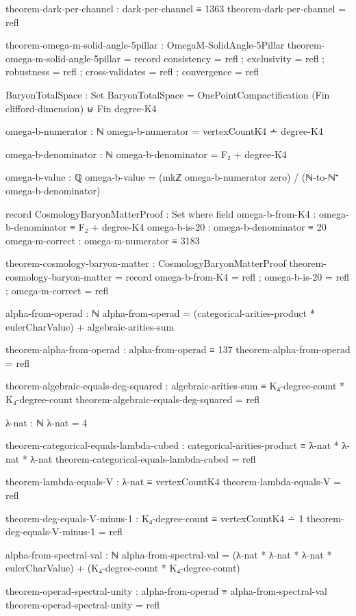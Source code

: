 \documentclass[11pt,a4paper]{book}
\begin{document}
\begin{code}
theorem-dark-per-channel : dark-per-channel ≡ 1363
theorem-dark-per-channel = refl

theorem-omega-m-solid-angle-5pillar : OmegaM-SolidAngle-5Pillar
theorem-omega-m-solid-angle-5pillar = record
  { consistency     = refl
  ; exclusivity     = refl
  ; robustness      = refl
  ; cross-validates = refl
  ; convergence     = refl
  }

BaryonTotalSpace : Set
BaryonTotalSpace = OnePointCompactification (Fin clifford-dimension) ⊎ Fin degree-K4

omega-b-numerator : ℕ
omega-b-numerator = vertexCountK4 ∸ degree-K4

omega-b-denominator : ℕ
omega-b-denominator = F₂ + degree-K4

omega-b-value : ℚ
omega-b-value = (mkℤ omega-b-numerator zero) / (ℕ-to-ℕ⁺ omega-b-denominator)

record CosmologyBaryonMatterProof : Set where
  field
    omega-b-from-K4 : omega-b-denominator ≡ F₂ + degree-K4
    omega-b-is-20   : omega-b-denominator ≡ 20
    omega-m-correct : omega-m-numerator ≡ 3183

theorem-cosmology-baryon-matter : CosmologyBaryonMatterProof
theorem-cosmology-baryon-matter = record
  { omega-b-from-K4 = refl
  ; omega-b-is-20   = refl
  ; omega-m-correct = refl
  }

alpha-from-operad : ℕ
alpha-from-operad = (categorical-arities-product * eulerCharValue) + algebraic-arities-sum

theorem-alpha-from-operad : alpha-from-operad ≡ 137
theorem-alpha-from-operad = refl

theorem-algebraic-equals-deg-squared : algebraic-arities-sum ≡ K₄-degree-count * K₄-degree-count
theorem-algebraic-equals-deg-squared = refl

λ-nat : ℕ
λ-nat = 4

theorem-categorical-equals-lambda-cubed : categorical-arities-product ≡ λ-nat * λ-nat * λ-nat
theorem-categorical-equals-lambda-cubed = refl

theorem-lambda-equals-V : λ-nat ≡ vertexCountK4
theorem-lambda-equals-V = refl

theorem-deg-equals-V-minus-1 : K₄-degree-count ≡ vertexCountK4 ∸ 1
theorem-deg-equals-V-minus-1 = refl

alpha-from-spectral-val : ℕ
alpha-from-spectral-val = (λ-nat * λ-nat * λ-nat * eulerCharValue) + (K₄-degree-count * K₄-degree-count)

theorem-operad-spectral-unity : alpha-from-operad ≡ alpha-from-spectral-val
theorem-operad-spectral-unity = refl


\end{code}
\end{document}
